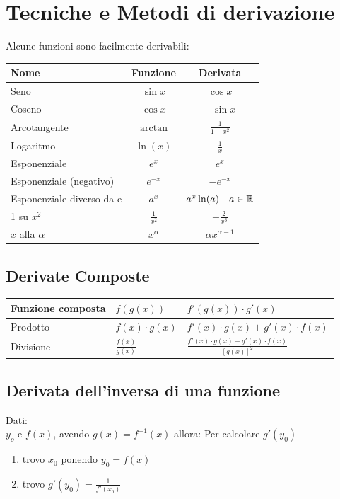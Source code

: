 \documentclass[12pt, a4paper, openany]{book}
\begin{document}
\section{Tecniche e Metodi di derivazione}
Alcune funzioni sono facilmente derivabili:\\
\begin{tabularx}{\textwidth}{|Y|c|c|}
	\hline
	\textbf{Nome}           & \textbf{Funzione} & \textbf{Derivata}     \\
	\hline
	\hline
	Seno                    & $\sin x$          & $\cos x$              \\
	\hline
	Coseno                  & $\cos x$          & $-\sin x$             \\
	\hline
	Arcotangente            & $\arctan$         & $\frac{1}{1+x^2}$     \\
	\hline
	Logaritmo               & $\ln(x) $         & $\frac{1}{x}$         \\
	\hline
	Esponenziale            & $e^x$             & $e^x$                 \\
	\hline
	Esponenziale (negativo) & $e^{-x}$          & $ -e^{-x}$            \\
	\hline
	Esponenziale diverso da e & $a^{x}$          & $ a^{x}\ln(a) \quad a \in \mathbb{R}$            \\
	 su $x^2$              & $\frac{1}{x^2}$   & $-\frac{2}{x^3}$      \\
	\hline
	$x$ alla $\alpha$       & $x^\alpha$        & $\alpha x^{\alpha-1}$ \\
	\hline
\end{tabularx}

\subsection{Derivate Composte}

\begin{tabularx}{\textwidth}{|l|Y|Y|}
	\hline
	Funzione composta & $f(g(x))$           & $ f'(g(x))\cdot g'(x)$                                \\
	\hline
	Prodotto     & $f(x)\cdot g(x)$    & $f'(x)\cdot g(x) + g'(x)\cdot f(x)$                   \\
	\hline
	Divisione    & $\frac{f(x)}{g(x)}$ & $\frac{f'(x)\cdot g(x) - g'(x) \cdot f(x)}{[g(x)]^2}$ \\
	\hline
\end{tabularx}

\subsection{Derivata dell'inversa di una funzione}
Dati:\\
$y_o$ e $f(x)$, avendo $g(x) = f^{-1}(x)$ allora:
Per calcolare $g'(y_0)$
\begin{enumerate}
	\item trovo $x_0$ ponendo $y_0=f(x)$
	\item trovo $g'(y_0)=\frac{1}{f'(x_0)}$
\end{enumerate}
\end{document}
